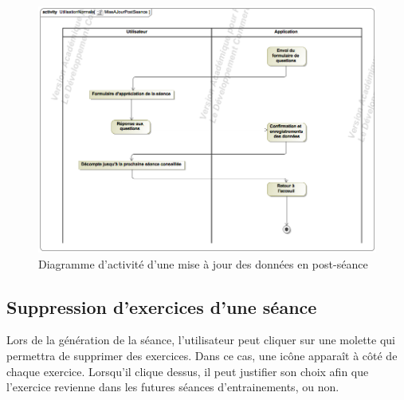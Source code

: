 \begin{figure}[!h]
\includegraphics[scale=0.3]{diagrams/post}
\centering
\caption{Diagramme d'activité d'une mise à jour des données en post-séance}
\end{figure}

\subsection*{Suppression d'exercices d'une séance}

Lors de la génération de la séance, l'utilisateur peut cliquer sur une molette qui permettra de supprimer des exercices. Dans ce cas, une icône apparaît à côté de chaque exercice. Lorsqu'il clique dessus, il peut justifier son choix afin que l'exercice revienne dans les futures séances d'entrainements, ou non.

